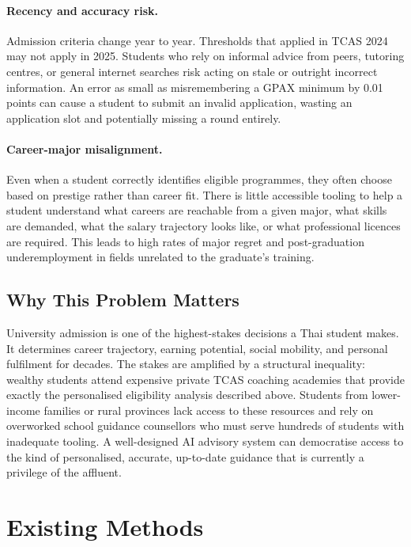 ﻿\documentclass[12pt,a4paper]{article}
\begin{document}
\paragraph{Recency and accuracy risk.} Admission criteria change year to year.
Thresholds that applied in TCAS 2024 may not apply in 2025. Students who rely on
informal advice from peers, tutoring centres, or general internet searches risk
acting on stale or outright incorrect information. An error as small as
misremembering a GPAX minimum by 0.01 points can cause a student to submit an
invalid application, wasting an application slot and potentially missing a round
entirely.

\paragraph{Career-major misalignment.} Even when a student correctly identifies
eligible programmes, they often choose based on prestige rather than career fit.
There is little accessible tooling to help a student understand what careers are
reachable from a given major, what skills are demanded, what the salary trajectory
looks like, or what professional licences are required. This leads to high rates of
major regret and post-graduation underemployment in fields unrelated to the
graduate's training.

\subsection{Why This Problem Matters}

University admission is one of the highest-stakes decisions a Thai student makes.
It determines career trajectory, earning potential, social mobility, and personal
fulfilment for decades. The stakes are amplified by a structural inequality: wealthy
students attend expensive private TCAS coaching academies that provide exactly the
personalised eligibility analysis described above. Students from lower-income
families or rural provinces lack access to these resources and rely on overworked
school guidance counsellors who must serve hundreds of students with inadequate
tooling. A well-designed AI advisory system can democratise access to the kind of
personalised, accurate, up-to-date guidance that is currently a privilege of the
affluent.

\section{Existing Methods}
\end{document}
